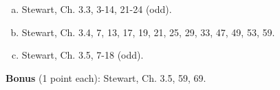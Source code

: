 \documentclass[12pt]{article}
\begin{document}
\begin{enumerate}[(a)]

\item
Stewart, Ch. 3.3, 3-14, 21-24 (odd).

\item
Stewart, Ch. 3.4, 7, 13, 17, 19, 21, 25, 29, 33, 47, 49, 53, 59.

\item
Stewart, Ch. 3.5, 7-18 (odd).

\end{enumerate}
{\bf Bonus} (1 point each):
Stewart, Ch. 3.5, 59, 69.
\end{document}
